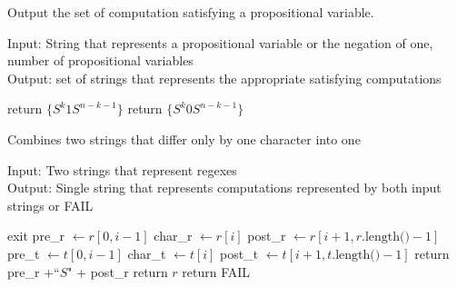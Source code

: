 \documentclass[runningheads]{llncs}
\begin{document}
\begin{algorithm}[H]
\caption{Output the set of computation satisfying a propositional variable.}
Input: String that represents a propositional variable or the negation of one, number of propositional variables \\
Output: set of strings that represents the appropriate satisfying computations
\begin{algorithmic}
     return $\{S^k1S^{n-k-1}\}$
    \EndIf 
     return $\{S^k0S^{n-k-1}\}$
    \EndIf
\EndProcedure
\end{algorithmic}
\end{algorithm}
\begin{algorithm}[H]
\caption{Combines two strings that differ only by one character into one}
Input: Two strings that represent regexes\\
Output: Single string that represents computations represented by both input strings or FAIL
\begin{algorithmic}
     exit
        \EndIf
        \State pre\_r $\leftarrow r[0, i-1]$ 
        \State char\_r $\leftarrow r[i]$ 
        \State post\_r $\leftarrow r[i+1, r\text{.length()}-1]$ 
        \State pre\_t $\leftarrow t[0, i-1]$ 
        \State char\_t $\leftarrow t[i]$ 
        \State post\_t $\leftarrow t[i+1, t\text{.length()}-1]$
                \State return pre\_r +``$S$" + post\_r 
            \Else
                \State return $r$
            \EndIf
        \EndIf
    \EndFor
    \State return FAIL 
\EndProcedure
\end{algorithmic}
\end{algorithm}
 
\end{document}

